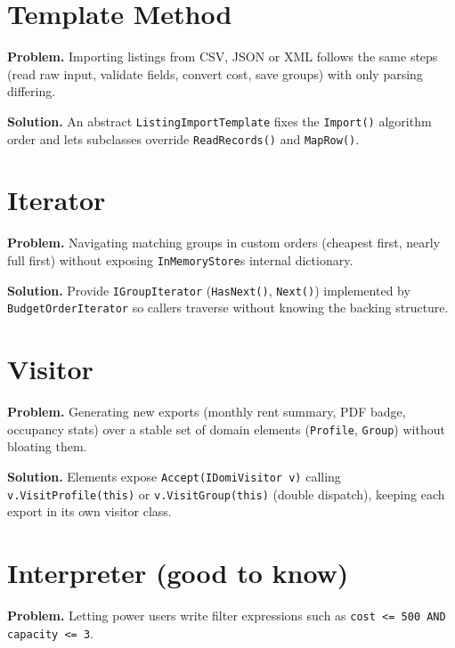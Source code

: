 \documentclass{utmreport}
\providecommand{\passthrough}[1]{#1}
\begin{document}
\section{Template Method}

\textbf{Problem.} Importing listings from CSV, JSON or XML follows the same steps (read raw input, validate fields, convert cost, save groups) with only parsing differing.

\textbf{Solution.} An abstract \passthrough{\lstinline!ListingImportTemplate!} fixes the \passthrough{\lstinline!Import()!} algorithm order and lets subclasses override \passthrough{\lstinline!ReadRecords()!} and \passthrough{\lstinline!MapRow()!}.

\section{Iterator}

\textbf{Problem.} Navigating matching groups in custom orders (cheapest first, nearly full first) without exposing \passthrough{\lstinline!InMemoryStore!}\textquotesingle s internal dictionary.

\textbf{Solution.} Provide \passthrough{\lstinline!IGroupIterator!} (\passthrough{\lstinline!HasNext()!}, \passthrough{\lstinline!Next()!}) implemented by \passthrough{\lstinline!BudgetOrderIterator!} so callers traverse without knowing the backing structure.

\section{Visitor}

\textbf{Problem.} Generating new exports (monthly rent summary, PDF badge, occupancy stats) over a stable set of domain elements (\passthrough{\lstinline!Profile!}, \passthrough{\lstinline!Group!}) without bloating them.

\textbf{Solution.} Elements expose \passthrough{\lstinline!Accept(IDomiVisitor v)!} calling \passthrough{\lstinline!v.VisitProfile(this)!} or \passthrough{\lstinline!v.VisitGroup(this)!} (double dispatch), keeping each export in its own visitor class.

\section{Interpreter (good to know)}

\textbf{Problem.} Letting power users write filter expressions such as \passthrough{\lstinline!cost <= 500 AND capacity <= 3!}.
\end{document}
